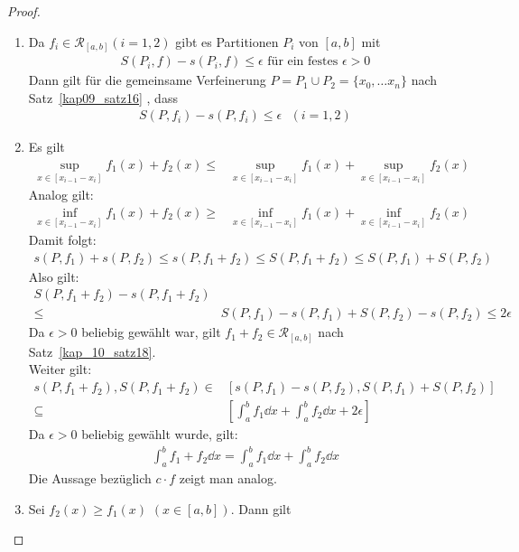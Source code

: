 \begin{proof}
	\begin{enumerate}
		\item Da $f_i \in \mathcal{R}_{[a,b]} (i = 1, 2)$ gibt es Partitionen 
		$P_i$ von $[a,b]$ mit 
		\begin{align*}
			S(P_i,f) - s(P_i,f) \leq \epsilon \text{ für ein festes } \epsilon > 0
		\end{align*}
		Dann gilt für die gemeinsame Verfeinerung $P = P_1 \cup P_2 = \{x_0, \hdots
		x_n\}$ nach Satz~\ref{kap09_satz16}
		, dass 
		\begin{align*}
			S(P,f_i) - s(P, f_i) \leq \epsilon \text{ }(i = 1,2)
		\end{align*}		 
		\item Es gilt 
		\begin{align*}
			\sup_{x \in [x_{i-1}-x_i]} f_1(x) +f_2(x) \leq & 
			\sup_{x \in [x_{i-1}-x_i]} f_1(x) + \sup_{x \in [x_{i-1}-x_i]} f_2(x)
		\end{align*}				
		Analog gilt: 
		\begin{align*}
			\inf_{x \in [x_{i-1}-x_i]} f_1(x) + f_2(x) \geq & 
			\inf_{x \in [x_{i-1}-x_i]} f_1(x) + \inf_{x \in [x_{i-1}-x_i]} f_2(x)
		\end{align*}				
		Damit folgt:
		\begin{align*}
			s(P,f_1) + s(P,f_2) \leq s(P,f_1 +f_2) \leq S(P,f_1 + f_2) 
			\leq S(P,f_1) + S(P,f_2)
		\end{align*}
		Also gilt:
		\begin{align*}
			S(P, f_1 + f_2) - s(P, f_1 +f_2) & \\
			\leq &  S(P, f_1) - s(P,f_1) + S(P,f_2) 
			-s(P,f_2) \leq 2 \epsilon
		\end{align*}
		Da $\epsilon >0 $ beliebig gewählt war, gilt $f_1 + f_2 \in 
		\mathcal{R}_{[a,b]}$ nach Satz~\ref{kap_10_satz18}. \\
		Weiter gilt: 
		\begin{align*}
			s(P, f_1 +f_2), S(P, f_1 + f_2) \in &
			[s(P,f_1) - s(P,f_2), S(P,f_1) + S(P,f_2)] \\
			\subseteq 
			& \left[ \int_a^b f_1 \dd{x} + \int_a^b f_2\dd{x} + 2\epsilon \right]
		\end{align*}
		Da $\epsilon > 0$ beliebig gewählt wurde, gilt:
		\begin{align*}
			\int_a^b f_1 + f_2 \dd{x}  = \int_a^b f_1\dd{x} + \int_a^b f_2 \dd{x}
		\end{align*}
		Die Aussage bezüglich  $c \cdot f$ zeigt man analog.
		\item Sei $f_2(x) \geq f_1(x)$ $(x \in [a,b])$. Dann gilt

\end{enumerate}
\end{proof}
